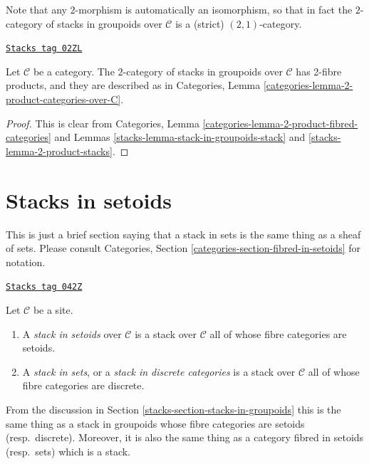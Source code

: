 Note that any $2$-morphism is automatically an isomorphism, so
that in fact the $2$-category of stacks in groupoids over $\mathcal{C}$
is a (strict) $(2, 1)$-category.

\begin{lemma}
\label{stacks-lemma-2-product-stacks-in-groupoids}
\href{https://stacks.math.columbia.edu/tag/02ZL}{\texttt{Stacks tag 02ZL}}

Let $\mathcal{C}$ be a category.
The $2$-category of stacks in groupoids over $\mathcal{C}$
has 2-fibre products, and they are described as in
Categories, Lemma \ref{categories-lemma-2-product-categories-over-C}.
\end{lemma}

\begin{proof}

This is clear from
Categories, Lemma \ref{categories-lemma-2-product-fibred-categories}
and Lemmas \ref{stacks-lemma-stack-in-groupoids-stack}
and \ref{stacks-lemma-2-product-stacks}.
\end{proof}

\section{Stacks in setoids}
\label{stacks-section-stacks-in-setoids}
This is just a brief section saying that a stack in sets
is the same thing as a sheaf of sets. Please consult
Categories, Section \ref{categories-section-fibred-in-setoids}
for notation.

\begin{definition}
\label{stacks-definition-stack-in-sets}
\href{https://stacks.math.columbia.edu/tag/042Z}{\texttt{Stacks tag 042Z}}

Let $\mathcal{C}$ be a site.
\begin{enumerate}
\item A {\it stack in setoids} over $\mathcal{C}$
is a stack over $\mathcal{C}$ all of whose fibre categories are
setoids.
\item A {\it stack in sets}, or a {\it stack in discrete categories}
is a stack over $\mathcal{C}$ all of whose fibre categories are discrete.
\end{enumerate}
\end{definition}

From the discussion in
Section \ref{stacks-section-stacks-in-groupoids}
this is the same thing as a stack in groupoids whose fibre categories
are setoids (resp.\ discrete). Moreover, it is also the same thing
as a category fibred in setoids (resp.\ sets) which is a stack.

